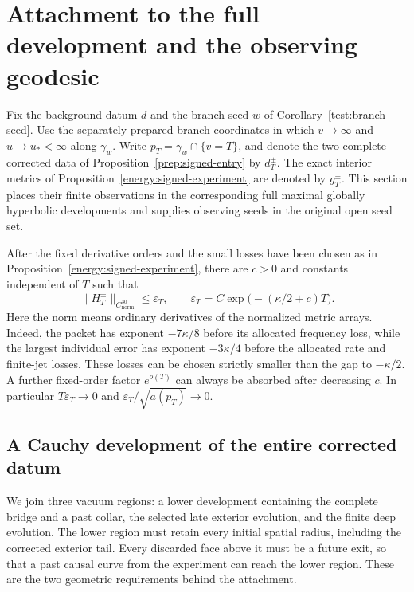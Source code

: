 \section{Attachment to the full development and the observing geodesic}
\label{attach:section}

Fix the background datum $d$ and the branch seed $w$ of
Corollary~\ref{test:branch-seed}. Use the separately prepared branch
coordinates in which $v\to\infty$ and $u\to u_*<\infty$ along
$\gamma_w$. Write $p_T=\gamma_w\cap\{v=T\}$, and denote the two
complete corrected data of Proposition~\ref{prep:signed-entry} by
$d_T^\pm$. The exact interior metrics of
Proposition~\ref{energy:signed-experiment} are denoted by $g_T^\pm$.
This section places their finite observations in the corresponding
full maximal globally hyperbolic developments and supplies observing
seeds in the original open seed set.

After the fixed derivative orders and the small losses have been
chosen as in Proposition~\ref{energy:signed-experiment}, there are
$c>0$ and constants independent of $T$ such that
\begin{equation}\label{attach:relative-smallness}
 \lVert H_T^\pm\rVert_{C^{30}_{\mathrm{norm}}}
 \le \varepsilon_T,
 \qquad \varepsilon_T=C\exp\bigl(- (\kappa/2+c)T\bigr).
\end{equation}
Here the norm means ordinary derivatives of the normalized metric
arrays. Indeed, the packet has exponent $-7\kappa/8$ before its
allocated frequency loss, while the largest individual error has
exponent $-3\kappa/4$ before the allocated rate and finite-jet losses.
These losses can be chosen strictly smaller than the gap to
$-\kappa/2$. A further fixed-order factor $e^{o(T)}$ can always be
absorbed after decreasing $c$. In particular
$T\varepsilon_T\to0$ and
$\varepsilon_T/\sqrt{a(p_T)}\to0$.

\subsection{A Cauchy development of the entire corrected datum}\label{attach:whole-bridge-section}

We join three vacuum regions: a lower development containing the
complete bridge and a past collar, the selected late exterior
evolution, and the finite deep evolution. The lower region must retain
every initial spatial radius, including the corrected exterior tail.
Every discarded face above it must be a future exit, so that a past
causal curve from the experiment can reach the lower region. These
are the two geometric requirements behind the attachment.

